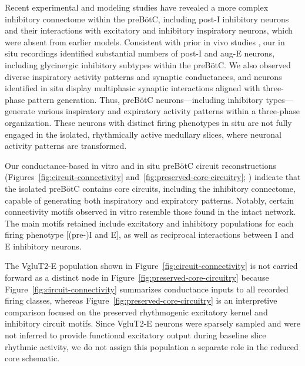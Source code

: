 \documentclass[
]{article}
\newcommand{\figref}[1]{Figure~\ref{#1}}
\newcommand{\figrefs}[2]{Figures~\ref{#1} and~\ref{#2}}
\begin{document}
Recent experimental and modeling studies have revealed a more complex inhibitory connectome within the preBötC, including post-I inhibitory neurons and their interactions with excitatory and inhibitory inspiratory neurons, which were absent from earlier models. Consistent with prior in vivo studies \citep[e.g.,][]{schwarzacher1995prebotzinger}, our in situ recordings \citep{molkov2024inference} identified substantial numbers of post-I and aug-E neurons, including glycinergic inhibitory subtypes within the preBötC. We also observed diverse inspiratory activity patterns and synaptic conductances, and neurons identified in situ display multiphasic synaptic interactions aligned with three-phase pattern generation. Thus, preBötC neurons---including inhibitory types---generate various inspiratory and expiratory activity patterns within a three-phase organization. These neurons with distinct firing phenotypes in situ are not fully engaged in the isolated, rhythmically active medullary slices, where neuronal activity patterns are transformed.

Our conductance-based in vitro and in situ preBötC circuit reconstructions (\figrefs{fig:circuit-connectivity}{fig:preserved-core-circuitry}; \citealp{molkov2024inference}) indicate that the isolated preBötC contains core circuits, including the inhibitory connectome, capable of generating both inspiratory and expiratory patterns. Notably, certain connectivity motifs observed in vitro resemble those found in the intact network. The main motifs retained include excitatory and inhibitory populations for each firing phenotype [(pre-)I and E], as well as reciprocal interactions between I and E inhibitory neurons.

The VgluT2-E population shown in \figref{fig:circuit-connectivity} is not carried forward as a distinct node in \figref{fig:preserved-core-circuitry} because \figref{fig:circuit-connectivity} summarizes conductance inputs to all recorded firing classes, whereas \figref{fig:preserved-core-circuitry} is an interpretive comparison focused on the preserved rhythmogenic excitatory kernel and inhibitory circuit motifs. Since VgluT2-E neurons were sparsely sampled and were not inferred to provide functional excitatory output during baseline slice rhythmic activity, we do not assign this population a separate role in the reduced core schematic.
\end{document}
